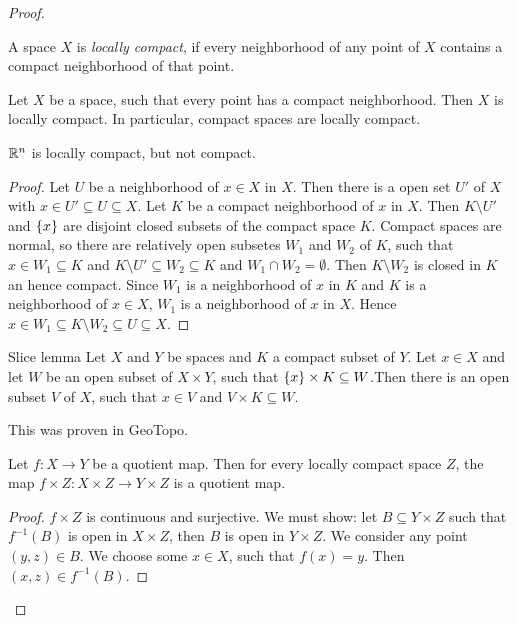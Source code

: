 \documentclass{TemplateLecture}
\begin{document}
\begin{proof}
    \begin{defi}{}{}
        A space \(X\) is \emph{locally compact}, if every neighborhood of any point of \(X\) contains a compact neighborhood of that point.
    \end{defi}
    \begin{lem}{}{}
        Let \(X\) be a space, such that every point has a compact neighborhood. Then \(X\) is locally compact. In particular, compact spaces are locally compact.
    \end{lem}
    \begin{example}
        \(\mathbb{R}^n\) is locally compact, but not compact.
    \end{example}
    \begin{proof}
        Let \(U\) be a neighborhood of \(x \in X\) in \(X\). Then there is a open set \(U'\) of \(X\) with \(x \in U' \subseteq U \subseteq X\). Let \(K\) be a compact neighborhood of \(x\) in \(X\). Then \(K\setminus U'\) and \(\{x\}\) are disjoint closed subsets of the compact space \(K\). Compact spaces are normal, so there are relatively open subsetes \(W_1\) and \(W_2\) of \(K\), such that \(x \in W_1 \subseteq K\) and \(K\setminus U' \subseteq W_2 \subseteq K\) and \(W_1 \cap W_2 = \emptyset\). Then \(K\setminus W_2\) is closed in \(K\) an hence compact. Since \(W_1\) is a neighborhood of \(x\) in \(K\) and \(K\) is a neighborhood of \(x \in X\), \(W_1\) is a neighborhood of \(x\) in \(X\). Hence \(x \in W_1 \subseteq K\setminus W_2 \subseteq U \subseteq X\).
    \end{proof}
    \begin{lem}{Slice lemma}{}
        Let \(X\) and \(Y\) be spaces and \(K\) a compact subset of \(Y\). Let \(x \in X\) and let \(W\) be an open subset of \(X\times Y\), such that \(\{x\} \times K \subseteq W\).Then there is an open subset \(V\) of \(X\), such that \(x \in V\) and \(V\times K\subseteq W\).
    \end{lem}
    This was proven in GeoTopo.
    \begin{thm}{}{}
        Let \(f\colon X \to Y\) be a quotient map. Then for every locally compact space \(Z\), the map \(f\times Z\colon X\times Z \to Y \times Z\) is a quotient map.
    \end{thm}
    \begin{proof}
        \(f\times Z\) is continuous and surjective. We must show: let \(B\subseteq Y \times Z\) such that \(f^{-1}(B)\) is open in \(X\times Z\), then \(B\) is open in \(Y\times Z\). We consider any point \((y,z) \in B\). We choose some \(x \in X\), such that \(f(x) = y\). Then \((x,z) \in f^{-1}(B)\).

\end{proof}
\end{proof}
\end{document}
